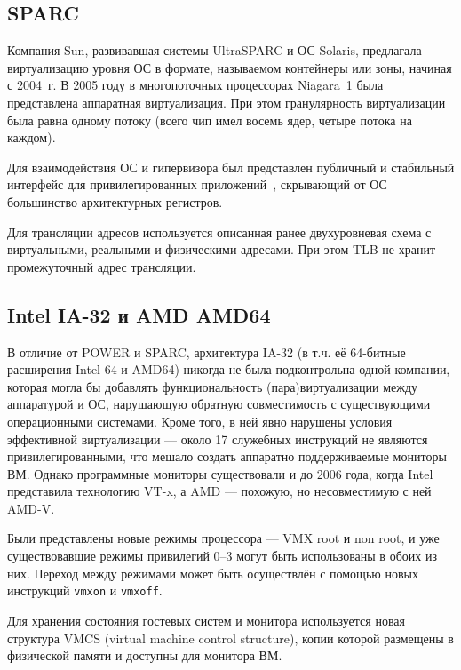 \subsection{SPARC}

Компания Sun, развивавшая системы UltraSPARC и ОС Solaris, предлагала виртуализацию уровня ОС в формате, называемом контейнеры или зоны, начиная с 2004~г. В 2005 году в многопоточных процессорах Niagara~1 была представлена аппаратная виртуализация. При этом гранулярность виртуализации была равна одному потоку (всего чип имел восемь ядер, четыре потока на каждом).

Для взаимодействия ОС и гипервизора был представлен публичный и стабильный интерфейс для привилегированных приложений~\cite{sun4v-spec}, скрывающий от ОС большинство архитектурных регистров.

Для трансляции адресов используется описанная ранее двухуровневая схема с виртуальными, реальными и физическими адресами. При этом TLB не хранит промежуточный адрес трансляции. 

\subsection{Intel IA-32 и AMD AMD64}

В отличие от POWER и SPARC, архитектура IA-32 (в т.ч. её 64-битные расширения Intel 64 и AMD64) никогда не была подконтрольна одной компании, которая могла бы добавлять функциональность (пара)виртуализации между аппаратурой и ОС, нарушающую обратную совместимость с существующими операционными системами. Кроме того, в ней явно нарушены условия эффективной виртуализации — около 17 служебных инструкций не являются привилегированными, что мешало создать аппаратно поддерживаемые мониторы ВМ. Однако программные мониторы существовали и до 2006 года, когда Intel представила технологию VT-x, а AMD — похожую, но несовместимую с ней AMD-V. 

Были представлены новые режимы процессора — VMX root и non root, и уже существовавшие режимы привилегий 0--3 могут быть использованы в обоих из них. Переход между режимами может быть осуществлён с помощью новых инструкций \texttt{vmxon} и \texttt{vmxoff}. 

Для хранения состояния гостевых систем и монитора используется новая структура VMCS (\abbr virtual machine control structure), копии которой размещены в физической памяти и доступны для монитора ВМ.

